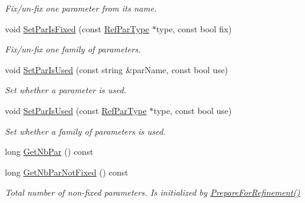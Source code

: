 \begin{DoxyCompactItemize}
\begin{DoxyCompactList}\small\item\em Fix/un-\/fix one parameter from its name. \end{DoxyCompactList}\item 
\mbox{\label{class_obj_cryst_1_1_refinable_obj_acc7f25893d4dc4cec08fd04a84aa008d}} 
void \mbox{\hyperlink{class_obj_cryst_1_1_refinable_obj_acc7f25893d4dc4cec08fd04a84aa008d}{Set\+Par\+Is\+Fixed}} (const \mbox{\hyperlink{class_obj_cryst_1_1_ref_par_type}{Ref\+Par\+Type}} $\ast$type, const bool fix)
\begin{DoxyCompactList}\small\item\em Fix/un-\/fix one family of parameters. \end{DoxyCompactList}\item 
\mbox{\label{class_obj_cryst_1_1_refinable_obj_a1d0737a4ecb7cb1339f3138cd792ba7c}} 
void \mbox{\hyperlink{class_obj_cryst_1_1_refinable_obj_a1d0737a4ecb7cb1339f3138cd792ba7c}{Set\+Par\+Is\+Used}} (const string \&par\+Name, const bool use)
\begin{DoxyCompactList}\small\item\em Set whether a parameter is used. \end{DoxyCompactList}\item 
\mbox{\label{class_obj_cryst_1_1_refinable_obj_a40eba4b59117dd18831286e05b5b982c}} 
void \mbox{\hyperlink{class_obj_cryst_1_1_refinable_obj_a40eba4b59117dd18831286e05b5b982c}{Set\+Par\+Is\+Used}} (const \mbox{\hyperlink{class_obj_cryst_1_1_ref_par_type}{Ref\+Par\+Type}} $\ast$type, const bool use)
\begin{DoxyCompactList}\small\item\em Set whether a family of parameters is used. \end{DoxyCompactList}\item 
long \mbox{\hyperlink{class_obj_cryst_1_1_refinable_obj_a3a45838e4463a17f1d32a892dc48c1dd}{Get\+Nb\+Par}} () const
\item 
\mbox{\label{class_obj_cryst_1_1_refinable_obj_aec578948ddf1786b64df6e83df57f0c5}} 
long \mbox{\hyperlink{class_obj_cryst_1_1_refinable_obj_aec578948ddf1786b64df6e83df57f0c5}{Get\+Nb\+Par\+Not\+Fixed}} () const
\begin{DoxyCompactList}\small\item\em Total number of non-\/fixed parameters. Is initialized by \mbox{\hyperlink{class_obj_cryst_1_1_refinable_obj_a6710a75c0477b6ad7e42400cdc6f1c32}{Prepare\+For\+Refinement()}} \end{DoxyCompactList}\item 

\end{DoxyCompactItemize}
